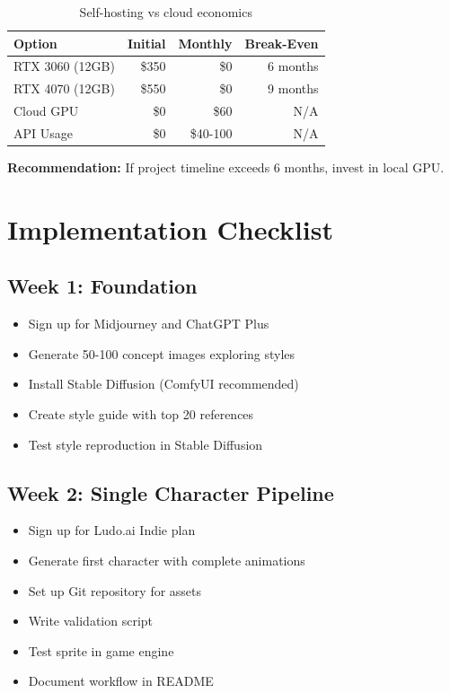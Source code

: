 \documentclass[11pt]{article}
\begin{document}
\begin{table}[H]
\centering
\begin{tabular}{lrrr}
\toprule
\textbf{Option} & \textbf{Initial} & \textbf{Monthly} & \textbf{Break-Even} \\
\midrule
RTX 3060 (12GB) & \$350 & \$0 & 6 months \\
RTX 4070 (12GB) & \$550 & \$0 & 9 months \\
Cloud GPU & \$0 & \$60 & N/A \\
API Usage & \$0 & \$40-100 & N/A \\
\bottomrule
\end{tabular}
\caption{Self-hosting vs cloud economics}
\end{table}

\textbf{Recommendation:} If project timeline exceeds 6 months, invest in local GPU.

\section{Implementation Checklist}

\subsection{Week 1: Foundation}

\begin{itemize}[label=$\square$]
    \item Sign up for Midjourney and ChatGPT Plus
    \item Generate 50-100 concept images exploring styles
    \item Install Stable Diffusion (ComfyUI recommended)
    \item Create style guide with top 20 references
    \item Test style reproduction in Stable Diffusion
\end{itemize}

\subsection{Week 2: Single Character Pipeline}

\begin{itemize}[label=$\square$]
    \item Sign up for Ludo.ai Indie plan
    \item Generate first character with complete animations
    \item Set up Git repository for assets
    \item Write validation script
    \item Test sprite in game engine
    \item Document workflow in README
\end{itemize}
\end{document}
